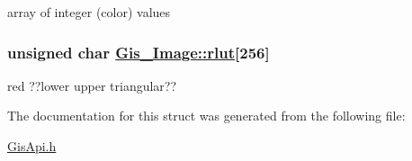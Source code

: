 array of integer (color) values 

\hypertarget{structGis__Image_o2}{
\subsubsection[rlut]{\setlength{\rightskip}{0pt plus 5cm}unsigned char \hyperlink{structGis__Image_o2}{Gis\_\-Image::rlut}\mbox{[}256\mbox{]}}}
\label{structGis__Image_o2}


red ??lower upper triangular?? 



The documentation for this struct was generated from the following file:\begin{CompactItemize}
\item 
\hyperlink{GisApi_8h}{Gis\-Api.h}\end{CompactItemize}
